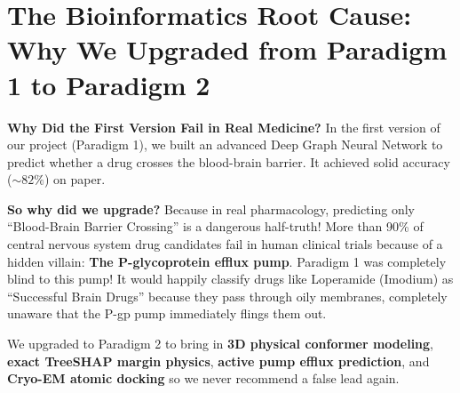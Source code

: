 \documentclass[11pt,a4paper]{article}
\begin{document}
\newpage
\section{The Bioinformatics Root Cause: Why We Upgraded from Paradigm 1 to Paradigm 2}

\begin{laymanbox}
\textbf{Why Did the First Version Fail in Real Medicine?}
In the first version of our project (Paradigm 1), we built an advanced Deep Graph Neural Network to predict whether a drug crosses the blood-brain barrier. It achieved solid accuracy ($\sim 82\%$) on paper.

\textbf{So why did we upgrade?} Because in real pharmacology, predicting only ``Blood-Brain Barrier Crossing'' is a dangerous half-truth!
More than 90\% of central nervous system drug candidates fail in human clinical trials because of a hidden villain: \textbf{The P-glycoprotein efflux pump}. Paradigm 1 was completely blind to this pump! It would happily classify drugs like Loperamide (Imodium) as ``Successful Brain Drugs'' because they pass through oily membranes, completely unaware that the P-gp pump immediately flings them out.

We upgraded to Paradigm 2 to bring in \textbf{3D physical conformer modeling}, \textbf{exact TreeSHAP margin physics}, \textbf{active pump efflux prediction}, and \textbf{Cryo-EM atomic docking} so we never recommend a false lead again.
\end{laymanbox}
\end{document}

